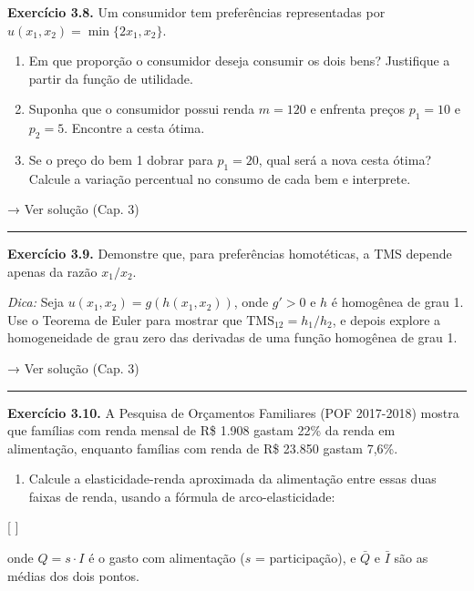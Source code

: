 \documentclass[11pt,twoside,openright]{book}
\providecommand{\tightlist}{\setlength{\itemsep}{0pt}\setlength{\parskip}{0pt}}
\begin{document}
\textbf{Exercício 3.8.} Um consumidor tem preferências representadas por
\(u(x_1, x_2) = \min\{2x_1, x_2\}\).

\begin{enumerate}
\def\labelenumi{(\alph{enumi})}
\item
  Em que proporção o consumidor deseja consumir os dois bens? Justifique
  a partir da função de utilidade.
\item
  Suponha que o consumidor possui renda \(m = 120\) e enfrenta preços
  \(p_1 = 10\) e \(p_2 = 5\). Encontre a cesta ótima.
\item
  Se o preço do bem 1 dobrar para \(p_1 = 20\), qual será a nova cesta
  ótima? Calcule a variação percentual no consumo de cada bem e
  interprete.
\end{enumerate}

→ Ver solução (Cap. 3)

\begin{center}\rule{0.5\linewidth}{0.5pt}\end{center}

\textbf{Exercício 3.9.} Demonstre que, para preferências homotéticas, a
TMS depende apenas da razão \(x_1/x_2\).

\emph{Dica:} Seja \(u(x_1, x_2) = g(h(x_1, x_2))\), onde \(g' > 0\) e
\(h\) é homogênea de grau 1. Use o Teorema de Euler para mostrar que
\(\text{TMS}_{12} = h_1/h_2\), e depois explore a homogeneidade de grau
zero das derivadas de uma função homogênea de grau 1.

→ Ver solução (Cap. 3)

\begin{center}\rule{0.5\linewidth}{0.5pt}\end{center}

\textbf{Exercício 3.10.} A Pesquisa de Orçamentos Familiares (POF
2017-2018) mostra que famílias com renda mensal de R\$ 1.908 gastam 22\%
da renda em alimentação, enquanto famílias com renda de R\$ 23.850
gastam 7,6\%.

\begin{enumerate}
\def\labelenumi{(\alph{enumi})}
\tightlist
\item
  Calcule a elasticidade-renda aproximada da alimentação entre essas
  duas faixas de renda, usando a fórmula de arco-elasticidade:
\end{enumerate}

{[} \varepsilon \approx {}
{]}

onde \(Q = s \cdot I\) é o gasto com alimentação (\(s\) = participação),
e \(\bar{Q}\) e \(\bar{I}\) são as médias dos dois pontos.
\end{document}
